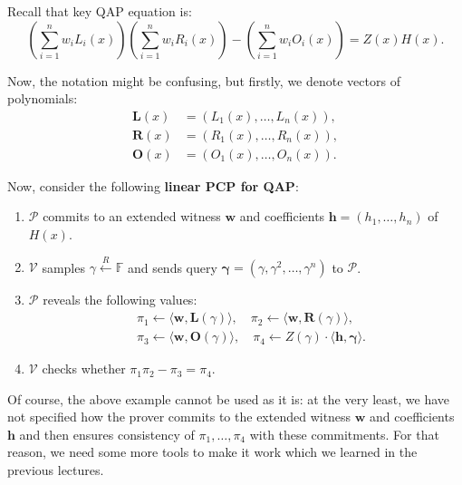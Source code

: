 \documentclass[../lecture-notes-148x210.tex]{subfiles}
\begin{document}
\begin{example}
    Recall that key QAP equation is:
    \begin{equation*}
        \left(\sum_{i=1}^nw_iL_i(x)\right)\left(\sum_{i=1}^nw_iR_i(x)\right) - \left(\sum_{i=1}^nw_iO_i(x)\right) = Z(x)H(x).
    \end{equation*}

    Now, the notation might be confusing, but firstly, we denote vectors of polynomials: 
    \begin{align*}
        \boldsymbol{L}(x) & = (L_1(x),\dots,L_n(x)), \\
        \boldsymbol{R}(x) & = (R_1(x),\dots,R_n(x)), \\
        \boldsymbol{O}(x) & = (O_1(x),\dots,O_n(x)).
    \end{align*}
    
    Now, consider the following \textbf{linear PCP for QAP}:
    \begin{enumerate}
        \item $\mathcal{P}$ commits to an extended witness $\mathbf{w}$ and coefficients $\mathbf{h} = (h_1,\dots,h_n)$ of $H(x)$.
        \item $\mathcal{V}$ samples $\gamma \xleftarrow{R} \mathbb{F}$ and sends query $\boldsymbol{\gamma} = (\gamma,\gamma^2,\dots,\gamma^n)$ to $\mathcal{P}$.
        \item $\mathcal{P}$ reveals the following values:
        \begin{equation*}
            \begin{aligned}
                &\pi_1 \gets \langle \mathbf{w}, \boldsymbol{L}(\gamma) \rangle, \quad \pi_2 \gets \langle \mathbf{w}, \boldsymbol{R}(\gamma) \rangle, \\
                &\pi_3 \gets \langle \mathbf{w}, \boldsymbol{O}(\gamma) \rangle, \quad \pi_4 \gets Z(\gamma) \cdot \langle \mathbf{h}, \boldsymbol{\gamma} \rangle.                
            \end{aligned}
        \end{equation*}
        \item $\mathcal{V}$ checks whether $\pi_1\pi_2 - \pi_3 = \pi_4$.
    \end{enumerate}
\end{example}

Of course, the above example cannot be used as it is: at the very least, we have not specified how the prover commits to the extended witness $\mathbf{w}$ and coefficients $\mathbf{h}$ and then ensures consistency of $\pi_1,\dots,\pi_4$ with these commitments. For that reason, we need some more tools to make it work which we learned in the previous lectures.
\end{document}
